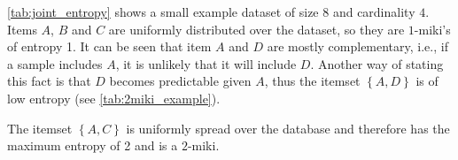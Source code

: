 \cref{tab:joint_entropy} shows a small example dataset of size $8$ and cardinality $4$. Items $A$, $B$ and $C$ are uniformly distributed over the dataset, so they are $1$-miki's of entropy \num{1}.
It can be seen that item $A$ and $D$ are mostly complementary, i.e., if a sample includes $A$, it is unlikely that it will include $D$.
Another way of stating this fact is that $D$ becomes predictable given $A$, thus the itemset $\left\{ A, D \right\}$ is of low entropy (see \cref{tab:2miki_example}).

The itemset $\left\{ A, C \right\}$ is uniformly spread over the database and therefore has the maximum entropy of \num{2} and is a $2$-miki.